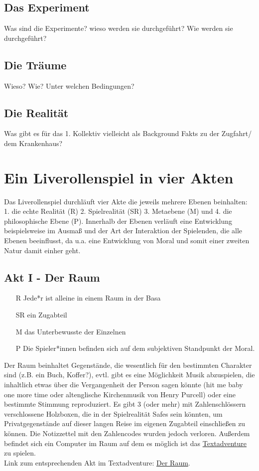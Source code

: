 \documentclass[12pt, a4paper, openany]{report}
\begin{document}
\subsection{Das Experiment}
Was sind die Experimente? wieso werden sie durchgeführt? Wie werden sie durchgeführt?

\subsection{Die Träume}
Wieso? Wie? Unter welchen Bedingungen?

\subsection{Die Realität}
Was gibt es für das 1. Kollektiv vielleicht als Background Fakts zu der Zugfahrt/ dem Krankenhaus?

\section{Ein Liverollenspiel in vier Akten}
Das Liverollenspiel durchläuft vier Akte die jeweils mehrere Ebenen beinhalten: 1. die echte Realität (R) 2. Spielrealität (SR) 3. Metaebene (M) und 4. die philosophische Ebene (P). Innerhalb der Ebenen verläuft eine Entwicklung beispielsweise im Ausmaß und der Art der Interaktion der Spielenden, die alle Ebenen beeinflusst, da u.a. eine Entwicklung von Moral und somit einer zweiten Natur damit einher geht.
\subsection{Akt I - Der Raum}
\begin{itemize}
\item[R] Jede*r ist alleine in einem Raum in der Basa
\item[SR] ein Zugabteil 
\item[M] das Unterbewusste der Einzelnen
\item[P] Die Spieler*innen befinden sich auf dem subjektiven Standpunkt der Moral. 
\end{itemize}
Der Raum beinhaltet Gegenstände, die wesentlich für den bestimmten Charakter sind (z.B. ein Buch, Koffer?), evtl. gibt es eine Möglichkeit Musik abzuspielen, die inhaltlich etwas über die Vergangenheit der Person sagen könnte (\glqq hit me baby one more time\grqq{} oder altenglische Kirchenmusik von Henry Purcell) oder eine bestimmte Stimmung reproduziert.
 Es gibt 3 (oder mehr) mit Zahlenschlössern verschlossene Holzboxen, die in der Spielrealität Safes sein könnten, um Privatgegenstände auf dieser langen Reise im eigenen Zugabteil einschließen zu können.
Die Notizzettel mit den Zahlencodes wurden jedoch verloren.
Außerdem befindet sich ein Computer im Raum auf dem es möglich ist das \hyperref[textadventure]{Textadventure} zu spielen.\\
Link zum entsprechenden Akt im Textadventure: \hyperref[der-raum]{Der Raum}.
\end{document}
